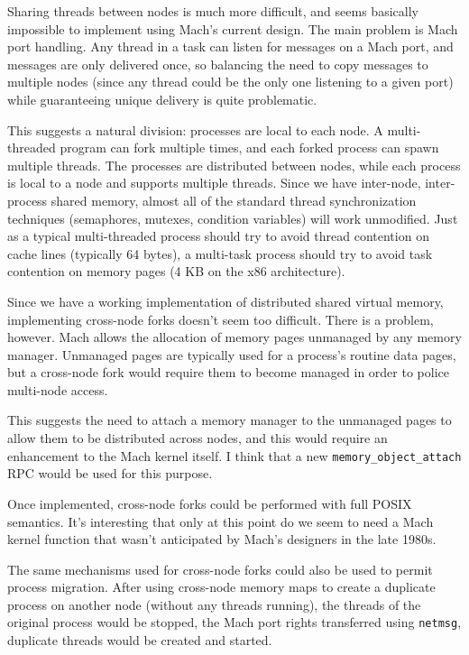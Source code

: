 \documentclass{article}
\def\netmsg{{\tt netmsg}\xspace}
\begin{document}
Sharing threads between nodes is much more difficult, and seems
basically impossible to implement using Mach's current design.  The
main problem is Mach port handling.  Any thread in a task can listen
for messages on a Mach port, and messages are only delivered once, so
balancing the need to copy messages to multiple nodes (since any
thread could be the only one listening to a given port) while
guaranteeing unique delivery is quite problematic.

This suggests a natural division: processes are local to each node.  A
multi-threaded program can fork multiple times, and each forked
process can spawn multiple threads.  The processes are distributed
between nodes, while each process is local to a node and supports
multiple threads.  Since we have inter-node, inter-process shared
memory, almost all of the standard thread synchronization techniques
(semaphores, mutexes, condition variables) will work unmodified.  Just
as a typical multi-threaded process should try to avoid thread
contention on cache lines (typically 64 bytes), a multi-task process
should try to avoid task contention on memory pages (4 KB on the x86
architecture).

Since we have a working implementation of distributed shared virtual
memory, implementing cross-node forks doesn't seem too difficult.
There is a problem, however.  Mach allows the allocation of memory
pages unmanaged by any memory manager.  Unmanaged pages are typically
used for a process's routine data pages, but a cross-node fork would
require them to become managed in order to police multi-node access.

This suggests the need to attach a memory manager to the unmanaged
pages to allow them to be distributed across nodes, and this would
require an enhancement to the Mach kernel itself.  I think that
a new {\tt memory_object_attach} RPC would be used for this
purpose.

Once implemented, cross-node forks could be performed with full POSIX
semantics.  It's interesting that only at this point do we seem
to need a Mach kernel function that wasn't anticipated by Mach's
designers in the late 1980s.

The same mechanisms used for cross-node forks could also be used to
permit process migration.  After using cross-node memory maps to
create a duplicate process on another node (without any threads
running), the threads of the original process would be stopped, the
Mach port rights transferred using \netmsg, duplicate threads would be
created and started.
\end{document}
